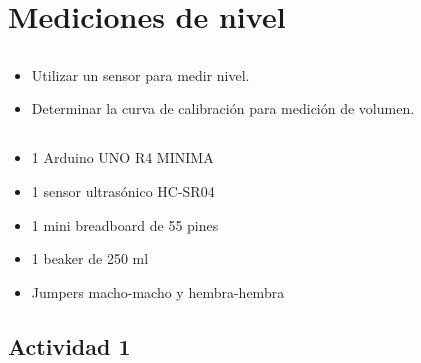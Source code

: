 \chapter{Mediciones de nivel}
\section{\obj}
\capacidad
\begin{itemize}
\item Utilizar un sensor para medir nivel.
\item Determinar la curva de calibración para medición de volumen.
\end{itemize}

\section{\mat}
\begin{itemize}
\item 1 Arduino UNO R4 MINIMA
\item 1 sensor ultrasónico HC-SR04
\item 1 mini breadboard de 55 pines
\item 1 beaker de 250 ml
\item Jumpers macho-macho y hembra-hembra
\end{itemize}

\section{Actividad 1}
